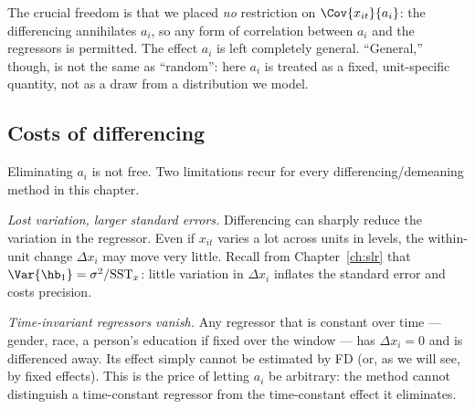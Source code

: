 
The crucial freedom is that we placed \emph{no} restriction on $\Cov{x_{it}}{a_i}$: the differencing annihilates $a_i$, so any form of correlation between $a_i$ and the regressors is permitted. The effect $a_i$ is left completely general. ``General,'' though, is not the same as ``random'': here $a_i$ is treated as a fixed, unit-specific quantity, not as a draw from a distribution we model.


\subsection{Costs of differencing}

Eliminating $a_i$ is not free. Two limitations recur for every differencing/demeaning method in this chapter.

\emph{Lost variation, larger standard errors.} Differencing can sharply reduce the variation in the regressor. Even if $x_{it}$ varies a lot across units in levels, the within-unit change $\Delta x_i$ may move very little. Recall from Chapter~\ref{ch:slr} that $\Var{\hb_1}=\sigma^2/\text{SST}_x$: little variation in $\Delta x_i$ inflates the standard error and costs precision.

\emph{Time-invariant regressors vanish.} Any regressor that is constant over time --- gender, race, a person's education if fixed over the window --- has $\Delta x_i = 0$ and is differenced away. Its effect simply cannot be estimated by FD (or, as we will see, by fixed effects). This is the price of letting $a_i$ be arbitrary: the method cannot distinguish a time-constant regressor from the time-constant effect it eliminates.

